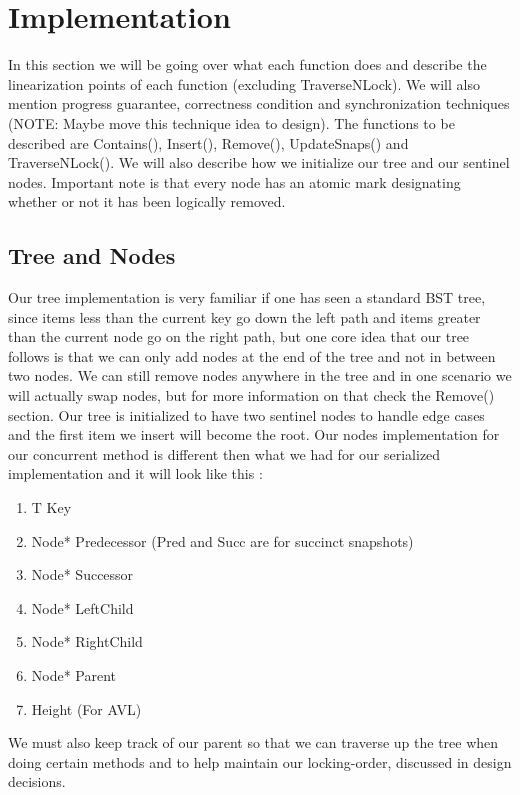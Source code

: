 \documentclass[conference]{IEEEtran}
\begin{document}

\section{Implementation}
In this section we will be going over what each function does and describe the linearization points of each function (excluding TraverseNLock). We will also mention progress guarantee, correctness condition and synchronization techniques (NOTE: Maybe move this technique idea to design). The functions to be described are Contains(), Insert(), Remove(), UpdateSnaps() and TraverseNLock(). We will also describe how we initialize our tree and our sentinel nodes. Important note is that every node has an atomic mark designating whether or not it has been logically removed.
\subsection{Tree and Nodes}
Our tree implementation is very familiar if one has seen a standard BST tree, since items less than the current key go down the left path and items greater than the current node go on the right path, but one core idea that our tree follows is that we can only add nodes at the end of the tree and not in between two nodes. We can still remove nodes anywhere in the tree and in one scenario we will actually swap nodes, but for more information on that check the Remove() section. Our tree is initialized to have two sentinel nodes to handle edge cases and the first item we insert will become the root. Our nodes implementation for our concurrent method is different then what we had for our serialized implementation and it will look like this :
\begin{enumerate}
\item T Key
\item Node* Predecessor (Pred and Succ are for succinct snapshots)
\item Node* Successor
\item Node* LeftChild
\item Node* RightChild
\item Node* Parent
\item Height (For AVL)
\end{enumerate}
We must also keep track of our parent so that we can traverse up the tree when doing certain methods and to help maintain our locking-order, discussed in design decisions.
\end{document}
